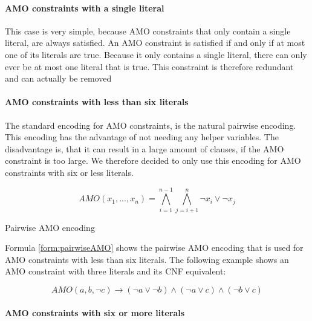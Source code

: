 \paragraph{AMO constraints with a single literal}

This case is very simple, because AMO constraints that only contain a single literal, are always satisfied. An AMO constraint is satisfied if and only if at most one of its literals are true. Because it only contains a single literal, there can only ever be at most one literal that is true. This constraint is therefore redundant and can actually be removed

\paragraph{AMO constraints with less than six literals}

The standard encoding for AMO constraints, is the natural pairwise encoding. This encoding has the advantage of not needing any helper variables. The disadvantage is, that it can result in a large amount of clauses, if the AMO constraint is too large. We therefore decided to only use this encoding for AMO constraints with six or less literals.

\begin{definition}[!htb]
\label{form:pairwiseAMO}
\centering
\begin{leftbar}
\begin{displaymath}
AMO(x_1,...,x_n) = \bigwedge_{i=1}^{n - 1} \bigwedge_{j=i+1}^{n} \neg x_i \vee \neg x_j
\end{displaymath}
\end{leftbar}
\caption{Pairwise AMO encoding}
\end{definition}

Formula \ref{form:pairwiseAMO} shows the pairwise AMO encoding that is used for AMO constraints with less than six literals. The following example shows an AMO constraint with three literals and its CNF equivalent:

\begin{leftbar}
\begin{displaymath}
AMO(a,b,\neg c) \rightarrow (\neg a \vee \neg b) \wedge (\neg a \vee c) \wedge (\neg b \vee c)
\end{displaymath}
\end{leftbar}

\paragraph{AMO constraints with six or more literals}

